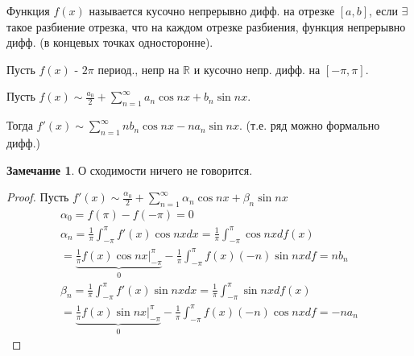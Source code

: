\documentclass{article}
\theoremstyle{definition}
\numberwithin{theorem}{section}
\numberwithin{lemma}{section}
\numberwithin{definition}{section}
\numberwithin{corollary}{section}
\newtheorem*{remark}{Замечание}
\numberwithin{equation}{section}
\newcommand\R{\ensuremath{\mathbb{R}}}
\begin{document}
\begin{definition}
  Функция $f(x)$ называется кусочно непрерывно дифф. на отрезке $[a,b]$,
  если $\exists$ такое разбиение отрезка, что на каждом отрезке разбиения,
  функция непрерывно дифф. (в концевых точках односторонне).
\end{definition}
\begin{theorem}
  Пусть $f(x)$ - $2\pi$ период., непр на $\R$ и кусочно непр. дифф. на $[-\pi,\pi]$.

  Пусть $f(x) \sim \frac{a_0}{2}+\sum_{n=1}^{\infty}a_n\cos nx + b_n \sin nx$.

  Тогда $f'(x) \sim \sum_{n=1}^{\infty} nb_n\cos nx - na_n\sin nx$.
  (т.е. ряд можно формально дифф.)
\end{theorem}
\begin{remark}
  О сходимости ничего не говорится.
\end{remark}
\begin{proof}
  Пусть $f'(x)\sim \frac{\alpha_0}{2}+\sum_{n=1}^{\infty}\alpha_n\cos nx + \beta_n\sin nx$
  \begin{gather*}
    \alpha_0=f(\pi) - f(-\pi)= 0 \\ 
    \alpha_n=\frac{1}{\pi}\int_{-\pi}^{\pi}f'(x)\cos nx dx = \frac{1}{\pi}\int_{-\pi}^{\pi}\cos nx df(x) \\ 
    = \underbrace{\frac{1}{\pi}f(x)\cos nx \Big|_{-\pi}^{\pi}}_{0}- \frac{1}{\pi}\int_{-\pi}^{\pi}f(x)(-n)\sin nx df = nb_n \\
    \beta_n=\frac{1}{\pi}\int_{-\pi}^{\pi}f'(x)\sin nx dx = \frac{1}{\pi}\int_{-\pi}^{\pi}\sin nx df(x) \\ 
    = \underbrace{\frac{1}{\pi}f(x)\sin nx \Big|_{-\pi}^{\pi}}_{0}- \frac{1}{\pi}\int_{-\pi}^{\pi}f(x)(-n)\cos nx df = -na_n
  \end{gather*}
\end{proof}
\end{document}
